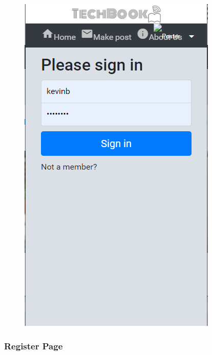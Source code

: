 \begin{figure}[H]
\begin{minipage}{.25\textwidth}
  \includegraphics[width=.9\linewidth]{img/ui/login_MOBILE.PNG}
  \label{fig:loginMOBILE}
\end{minipage}
\end{figure}

\subsubsection{Register Page}
